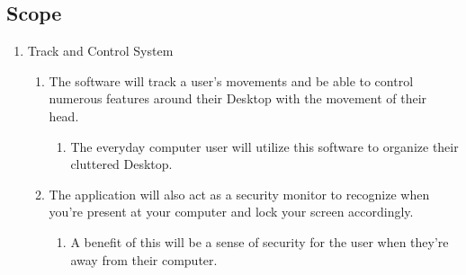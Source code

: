 \documentclass[titlepage]{article}
\begin{document}
\subsection{Scope}
\begin{enumerate}
	\item Track and Control System
  \begin{enumerate}
  	\item The software will track a user's movements and be able to control numerous features around their Desktop with the movement of their head.
  	\begin{enumerate} 	 	
  		\item The everyday computer user will utilize this software to organize their cluttered Desktop.  	
  	\end{enumerate}
  	\item The application will also act as a security monitor to recognize when you're present at your computer and lock your screen accordingly.
  	\begin{enumerate}
  		\item A benefit of this will be a sense of security for the user when they're away from their computer.
  	\end{enumerate}
  \end{enumerate} 
\end{enumerate}
\end{document}
